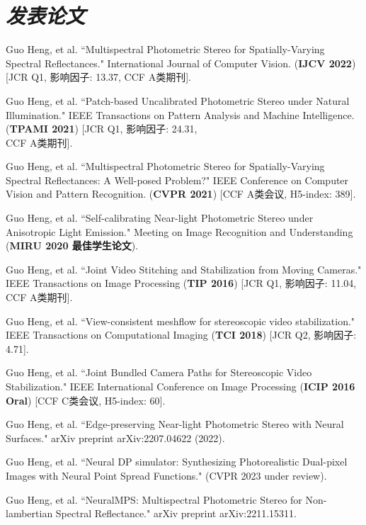 \documentclass[UTF8]{ctexart}
\begin{document}
	\section{\textit{\textbf{发表论文}}}
	\begin{enumerate}[label={[\arabic*]}]
		\item Guo Heng, et al. ``Multispectral Photometric Stereo for Spatially-Varying Spectral Reflectances." International Journal of Computer Vision. (\textbf{IJCV 2022}) [JCR Q1, 影响因子: 13.37, CCF A类期刊]. 
		\item Guo Heng, et al. ``Patch-based Uncalibrated Photometric Stereo under Natural Illumination." 
		IEEE Transactions on Pattern Analysis and Machine Intelligence. (\textbf{TPAMI 2021}) [JCR Q1, 影响因子: 24.31,\\ CCF A类期刊]. 
		\item Guo Heng, et al. ``Multispectral Photometric Stereo for Spatially-Varying Spectral Reflectances: A Well-posed Problem?" IEEE Conference on Computer Vision and Pattern Recognition. (\textbf{CVPR 2021}) [CCF A类会议, H5-index: 389]. 
		\item Guo Heng, et al. ``Self-calibrating Near-light Photometric Stereo under Anisotropic Light Emission." Meeting on Image Recognition and Understanding (\textbf{MIRU 2020 最佳学生论文}).  
		\item Guo Heng, et al. ``Joint Video Stitching and Stabilization from Moving Cameras." IEEE Transactions on Image Processing (\textbf{TIP 2016}) [JCR Q1, 影响因子: 11.04, CCF A类期刊].
		\item Guo Heng, et al. ``View-consistent meshflow for stereoscopic video stabilization." IEEE Transactions on Computational Imaging (\textbf{TCI 2018}) [JCR Q2, 影响因子: 4.71].
		\item Guo Heng, et al. ``Joint Bundled Camera Paths for Stereoscopic Video Stabilization." IEEE International Conference on Image Processing (\textbf{ICIP 2016 Oral}) [CCF C类会议, H5-index: 60].
		\item Guo Heng, et al. ``Edge-preserving Near-light Photometric Stereo with Neural Surfaces." arXiv preprint arXiv:2207.04622 (2022). 
		\item Guo Heng, et al. ``Neural DP simulator: Synthesizing Photorealistic Dual-pixel Images with Neural Point Spread Functions." (CVPR 2023 under review). 
		\item Guo Heng, et al. ``NeuralMPS: Multispectral Photometric Stereo for Non-lambertian Spectral Reflectance." arXiv preprint arXiv:2211.15311. 
	\end{enumerate}
	
\end{document}
